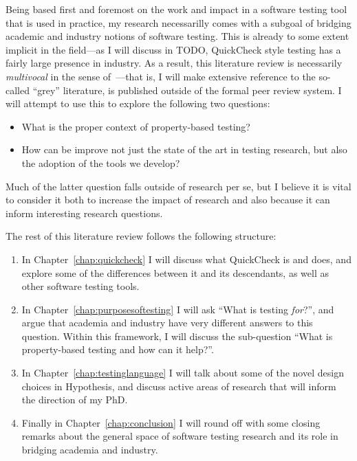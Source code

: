 Being based first and foremost on the work and impact in a software testing tool that is used in practice,
my research necessarilly comes with a subgoal of bridging academic and industry notions of software testing.
This is already to some extent implicit in the field---as
I will discuss in TODO,
QuickCheck style testing has a fairly large presence in industry.
As a result,
this literature review is necessarily \emph{multivocal} in the sense of~\cite{DBLP:conf/ease/GarousiFM16}---that is,
I will make extensive reference to the so-called ``grey'' literature,
is published outside of the formal peer review system.
I will attempt to use this to explore the following two questions:

\begin{itemize}
\item What is the proper context of property-based testing?
\item How can be improve not just the state of the art in testing research,
but also the adoption of the tools we develop?
\end{itemize}

Much of the latter question falls outside of research per se,
but I believe it is vital to consider it both to increase the impact of research and also because it can inform interesting research questions.

The rest of this literature review follows the following structure:

\begin{enumerate}
\item In Chapter~\ref{chap:quickcheck} I will discuss what QuickCheck is and does,
and explore some of the differences between it and its descendants,
as well as other software testing tools.
\item In Chapter~\ref{chap:purposesoftesting} I will ask ``What is testing \emph{for}?'',
and argue that academia and industry have very different answers to this question.
Within this framework, I will discuss the sub-question ``What is property-based testing and how can it help?''.
\item In Chapter~\ref{chap:testinglanguage} I will talk about some of the novel design choices in Hypothesis,
and discuss active areas of research that will inform the direction of my PhD.
\item Finally in Chapter~\ref{chap:conclusion} I will round off with some closing remarks about the general space of software testing research and its role in bridging academia and industry.
\end{enumerate} 

